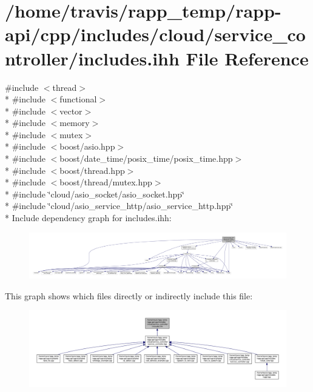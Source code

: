 \hypertarget{cloud_2service__controller_2includes_8ihh}{\section{/home/travis/rapp\-\_\-temp/rapp-\/api/cpp/includes/cloud/service\-\_\-controller/includes.ihh File Reference}
\label{cloud_2service__controller_2includes_8ihh}
}
{\ttfamily \#include $<$thread$>$}\\*
{\ttfamily \#include $<$functional$>$}\\*
{\ttfamily \#include $<$vector$>$}\\*
{\ttfamily \#include $<$memory$>$}\\*
{\ttfamily \#include $<$mutex$>$}\\*
{\ttfamily \#include $<$boost/asio.\-hpp$>$}\\*
{\ttfamily \#include $<$boost/date\-\_\-time/posix\-\_\-time/posix\-\_\-time.\-hpp$>$}\\*
{\ttfamily \#include $<$boost/thread.\-hpp$>$}\\*
{\ttfamily \#include $<$boost/thread/mutex.\-hpp$>$}\\*
{\ttfamily \#include \char`\"{}cloud/asio\-\_\-socket/asio\-\_\-socket.\-hpp\char`\"{}}\\*
{\ttfamily \#include \char`\"{}cloud/asio\-\_\-service\-\_\-http/asio\-\_\-service\-\_\-http.\-hpp\char`\"{}}\\*
Include dependency graph for includes.\-ihh\-:
\nopagebreak
\begin{figure}[H]
\begin{center}
\leavevmode
\includegraphics[width=350pt]{cloud_2service__controller_2includes_8ihh__incl}
\end{center}
\end{figure}
This graph shows which files directly or indirectly include this file\-:
\nopagebreak
\begin{figure}[H]
\begin{center}
\leavevmode
\includegraphics[width=350pt]{cloud_2service__controller_2includes_8ihh__dep__incl}
\end{center}
\end{figure}
